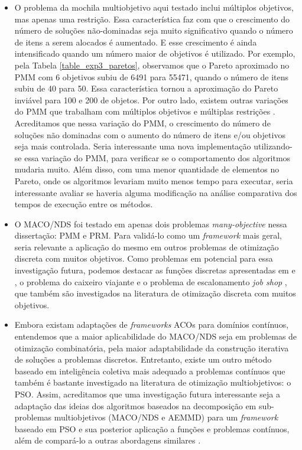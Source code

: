 \begin{itemize}
	\item O problema da mochila multiobjetivo aqui testado inclui múltiplos objetivos, mas apenas uma restrição. Essa característica faz com que o crescimento do número de soluções não-dominadas seja muito significativo quando o número de itens a serem alocados é aumentado. E esse crescimento é ainda intensificado quando um número maior de objetivos é utilizado. Por exemplo, pela Tabela \ref{table_exp3_paretos}, observamos  que o Pareto aproximado no PMM com 6 objetivos subiu de 6491 para 55471, quando o número de itens subiu de 40 para 50. Essa característica tornou a aproximação do Pareto inviável para 100 e 200 de objetos. Por outro lado, existem outras variações do PMM que trabalham com múltiplos objetivos e múltiplas restrições \cite{Ishibuchi2015,Alaya2007}. Acreditamos que nessa variação do PMM, o crescimento do número de soluções não dominadas com o aumento do número de itens e/ou objetivos seja mais controlada. Seria interessante uma nova implementação utilizando-se essa variação do PMM, para verificar se o comportamento dos algoritmos mudaria muito. Além disso, com uma menor quantidade de elementos no Pareto, onde os algoritmos levariam muito menos tempo para executar, seria interessante avaliar se haveria alguma modificação na análise comparativa dos tempos de execução entre os métodos.
	
	\item O MACO/NDS foi testado em apenas dois problemas \textit{many-objective} nessa dissertação: PMM e PRM. Para validá-lo como um \textit{framework} mais geral, seria relevante a aplicação do mesmo em outros problemas de otimização discreta com muitos objetivos. Como problemas em potencial para essa investigação futura, podemos destacar as funções discretas apresentadas em \cite{DiscreteFunctions1} e  \cite{DiscreteFunctions2}, o problema do caixeiro viajante \cite{Riveros2016} e o problema de escalonamento \textit{job shop} \cite{JobShop}, que também são investigados na literatura de otimização discreta com muitos objetivos.
	
	\item Embora existam adaptações de \textit{frameworks} ACOs para domínios contínuos, entendemos que a maior aplicabilidade do MACO/NDS seja em problemas de otimização combinatória, pela maior adaptabilidade da construção iterativa de soluções a problemas discretos. Entretanto, existe um outro método baseado em inteligência coletiva mais adequado a problemas contínuos que também é bastante investigado na literatura de otimização multiobjetivos: o PSO. Assim, acreditamos que uma investigação futura interessante seja a adaptação das ideias dos algoritmos baseados na decomposição em sub-problemas multiobjetivos (MACO/NDS e AEMMD) para um \textit{framework} baseado em PSO e sua posterior aplicação a funções e problemas contínuos, além de compará-lo a outras abordagens similares \cite{Freire2017}.
\end{itemize}

